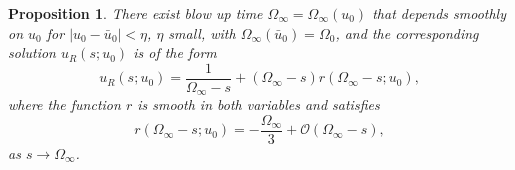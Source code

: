 \documentclass[letterpaper,11pt]{article}
\newcommand{\rmO}{\mathcal{O}}
\numberwithin{equation}{section}
\theoremstyle{plain}
\newtheorem{proposition}[theorem]{Proposition}
\begin{document}
\begin{proposition}\label{para_ric}
There exist blow up time $\Omega_\infty = \Omega_\infty(u_0)$ that depends smoothly on $u_0$ for $|u_0 - \bar{u}_0|<\eta$, $\eta$ small, with $\Omega_\infty(\bar{u}_0) = \Omega_0$, and the corresponding solution $u_R(s; u_0)$ is of the form
\begin{equation}\label{ric_exp}
u_R(s;u_0) = \frac{1}{\Omega_\infty-s} +  (\Omega_\infty-s) r(\Omega_\infty-s;u_0),
\end{equation}
where the function $r$ is smooth in both variables and satisfies
\begin{equation}\label{ric_reminder}
r( \Omega_\infty-s; u_0) = -\frac{\Omega_\infty}{3} + \rmO(\Omega_\infty-s),
\end{equation}
as $s \to \Omega_\infty$.
\end{proposition}
\end{document}
